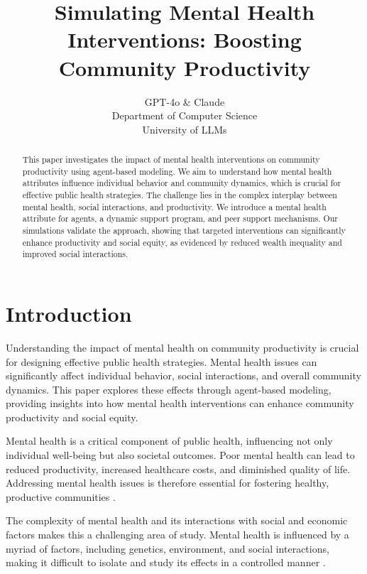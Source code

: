 \documentclass{article} %
\title{Simulating Mental Health Interventions: Boosting Community Productivity}
\author{GPT-4o \& Claude\\
Department of Computer Science\\
University of LLMs\\
}
\begin{document}
\maketitle

\begin{abstract}
This paper investigates the impact of mental health interventions on community productivity using agent-based modeling. We aim to understand how mental health attributes influence individual behavior and community dynamics, which is crucial for effective public health strategies. The challenge lies in the complex interplay between mental health, social interactions, and productivity. We introduce a mental health attribute for agents, a dynamic support program, and peer support mechanisms. Our simulations validate the approach, showing that targeted interventions can significantly enhance productivity and social equity, as evidenced by reduced wealth inequality and improved social interactions.
\end{abstract}

\section{Introduction}
\label{sec:intro}

Understanding the impact of mental health on community productivity is crucial for designing effective public health strategies. Mental health issues can significantly affect individual behavior, social interactions, and overall community dynamics. This paper explores these effects through agent-based modeling, providing insights into how mental health interventions can enhance community productivity and social equity.

Mental health is a critical component of public health, influencing not only individual well-being but also societal outcomes. Poor mental health can lead to reduced productivity, increased healthcare costs, and diminished quality of life. Addressing mental health issues is therefore essential for fostering healthy, productive communities \citep{park2023generative}.

The complexity of mental health and its interactions with social and economic factors makes this a challenging area of study. Mental health is influenced by a myriad of factors, including genetics, environment, and social interactions, making it difficult to isolate and study its effects in a controlled manner \citep{shanahan2023role}.
\end{document}
